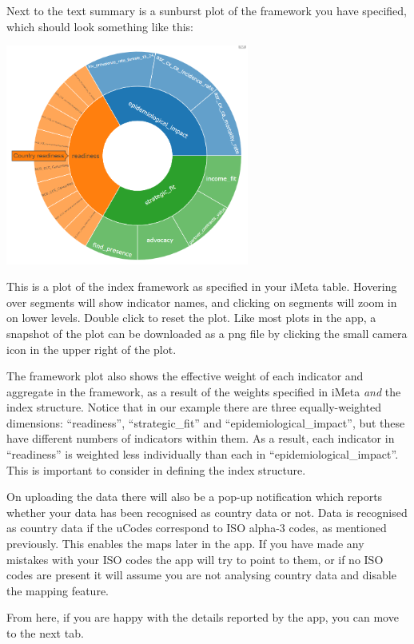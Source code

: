 \documentclass[
  letterpaper,
  DIV=11,
  numbers=noendperiod]{scrreprt}
\begin{document}
Next to the text summary is a sunburst plot of the framework you have
specified, which should look something like this:

\includegraphics[width=0.6\textwidth,height=\textheight]{figs/data_input_6.png}

This is a plot of the index framework as specified in your iMeta table.
Hovering over segments will show indicator names, and clicking on
segments will zoom in on lower levels. Double click to reset the plot.
Like most plots in the app, a snapshot of the plot can be downloaded as
a png file by clicking the small camera icon in the upper right of the
plot.

The framework plot also shows the effective weight of each indicator and
aggregate in the framework, as a result of the weights specified in
iMeta \emph{and} the index structure. Notice that in our example there
are three equally-weighted dimensions: ``readiness'', ``strategic\_fit''
and ``epidemiological\_impact'', but these have different numbers of
indicators within them. As a result, each indicator in ``readiness'' is
weighted less individually than each in ``epidemiological\_impact''.
This is important to consider in defining the index structure.

On uploading the data there will also be a pop-up notification which
reports whether your data has been recognised as country data or not.
Data is recognised as country data if the uCodes correspond to ISO
alpha-3 codes, as mentioned previously. This enables the maps later in
the app. If you have made any mistakes with your ISO codes the app will
try to point to them, or if no ISO codes are present it will assume you
are not analysing country data and disable the mapping feature.

From here, if you are happy with the details reported by the app, you
can move to the next tab.
\end{document}
